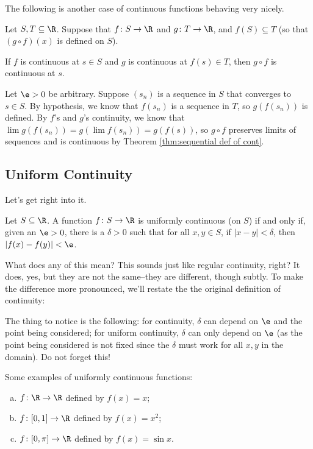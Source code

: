 \documentclass[class=article, crop=false]{standalone}
\begin{document}
The following is another case of continuous functions behaving very nicely.
\begin{thm}
    Let $S,T \subseteq \R$. Suppose that $f \colon S \to \R$ and $g \colon T \to \R$, and $f(S) \subseteq T$ (so that $(g \circ f)(x)$ is defined on $S$).

    If $f$ is continuous at $s \in S$ and $g$ is continuous at $f(s) \in T$, then $g \circ f$ is continuous at $s$.
\end{thm}
\begin{pf}
    Let $\e > 0$ be arbitrary. Suppose $(s_n)$ is a sequence in $S$ that converges to $s \in S$. By hypothesis, we know that $f(s_n)$ is a sequence in $T$, so $g(f(s_n))$ is defined. By $f$'s and $g$'s continuity, we know that $\lim g(f(s_n)) = g(\lim f(s_n)) = g(f(s))$, so $g \circ f$ preserves limits of sequences and is continuous by Theorem \ref{thm:sequential def of cont}.
\end{pf}



\subsection{Uniform Continuity}

Let's get right into it.
\begin{defn}
    Let $S \subseteq \R$. A function $f \colon S \to \R$ is uniformly continuous (on $S$) if and only if, given an $\e > 0$, there is a $\delta > 0$ such that for all $x,y \in S$, if $|x-y| < \delta$, then $|f(x)-f(y)| < \e$.
\end{defn}
What does any of this mean? This sounds just like regular continuity, right? It does, yes, but they are not the same--they are different, though subtly. To make the difference more pronounced, we'll restate the the original definition of continuity:
\begin{tcolorbox}[colback=definitionBackground, colframe=definitionBackground, sharp corners, before upper={\parindent24pt}]
    \continuity*
\end{tcolorbox}
The thing to notice is the following: for continuity, $\delta$ can depend on $\e$ and the point being considered; for uniform continuity, $\delta$ can only depend on $\e$ (as the point being considered is not fixed since the $\delta$ must work for all $x,y$ in the domain). Do not forget this!

\begin{ex}
    Some examples of uniformly continuous functions:
        \begin{enumerate}[(a)]
            \item $f \colon \R \to \R$ defined by $f(x)=x$;
            \item $f \colon [0,1] \to \R$ defined by $f(x) = x^2$;
            \item $f \colon [0,\pi] \to \R$ defined by $f(x) = \sin x$.
        \end{enumerate}
\end{ex}
\end{document}
